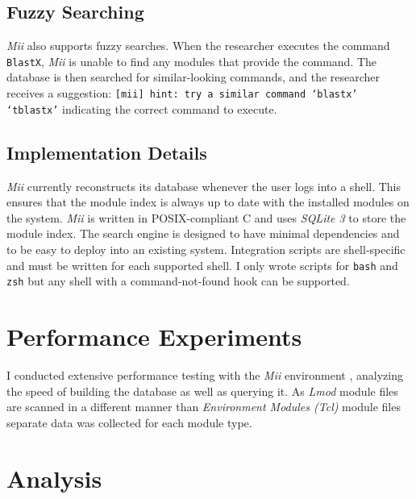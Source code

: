 \documentclass[manuscript,screen]{acmart}
\begin{document}
\subsection{Fuzzy Searching}

\textit{Mii} also supports fuzzy searches. When the researcher executes the command \texttt{BlastX}, \textit{Mii} is unable to find
any modules that provide the command. The database is then searched for similar-looking commands, and
the researcher receives a suggestion: \texttt{[mii] hint: try a similar command ‘blastx’ ‘tblastx’} indicating
the correct command to execute.

\subsection{Implementation Details}

\textit{Mii} currently reconstructs its database whenever the user logs into a shell. This ensures that the module index is
always up to date with the installed modules on the system. \textit{Mii} is written in POSIX-compliant C and uses
\textit{SQLite 3} to store the module index. The search engine is designed to have minimal dependencies and to be
easy to deploy into an existing system. Integration scripts are shell-specific and must be written for each
supported shell. I only wrote scripts for \texttt{bash} and \texttt{zsh} but any shell with a command-not-found hook can be
supported.

\section{Performance Experiments}

I conducted extensive performance testing with the \textit{Mii} environment \cite{MiiPage}, analyzing the speed of building the
database as well as querying it. As \textit{Lmod} module files are scanned in a different manner than \textit{Environment Modules (Tcl)}
module files separate data was collected for each module type.

\section{Analysis}
\end{document}
